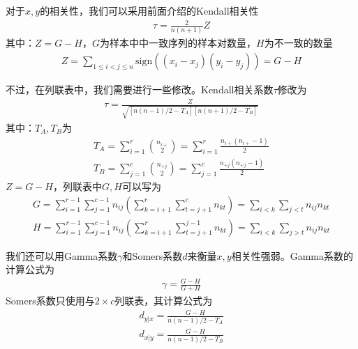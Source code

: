             \par
            对于$x,y$的相关性，我们可以采用前面介绍的Kendall相关性
            \begin{align*}
            \tau = \frac{2}{n(n+1)}Z
            \end{align*}
            其中：$Z = G-H$，$G$为样本中中一致序列的样本对数量，$H$为不一致的数量
            \begin{align*}
            Z = \sum_{1 \leqslant i<j \leqslant n} \mathrm{sign}((x_i-x_j)(y_i-y_j)) = G-H
            \end{align*}
            \par
            不过，在列联表中，我们需要进行一些修改。Kendall相关系数$\tau$修改为
            \begin{align*}
            \tau = \frac{Z}{\sqrt{[n(n-1)/2-T_A][n(n+1)/2-T_B]}}
            \end{align*}
            其中：$T_A,T_B$为
            \begin{align*}
            T_A = \sum_{i=1}^r \binom{n_{i+}}{2} = \sum_{i=1}^r\frac{n_{i+}(n_{i+}-1)}{2}\\
            T_B = \sum_{j=1}^c \binom{n_{+j}}{2} = \sum_{j=1}^c\frac{n_{+j}(n_{+j}-1)}{2}
            \end{align*}
            $Z = G-H$，列联表中$G,H$可以写为
            \begin{align*}
            G = \sum_{i=1}^{r-1}\sum_{j=1}^{c-1} n_{ij} \left( \sum_{k=i+1}^r\sum_{t=j+1}^c n_{kt}\right)  = \sum_{i<k}\sum_{j<t}n_{ij}n_{kt}\\
            H = \sum_{i=1}^{r-1}\sum_{j=1}^{c-1} n_{ij} \left( \sum_{k=i+1}^r\sum_{t=j+1}^{j-1} n_{kt}\right)  = \sum_{i<k}\sum_{j>t}n_{ij}n_{kt}
            \end{align*}
            \par
            我们还可以用Gamma系数$\gamma$和Somers系数$d$来衡量$x,y$相关性强弱。Gamma系数的计算公式为
            \begin{align*}
            \gamma = \frac{G-H}{G+H}
            \end{align*}
            Somers系数只使用与$2\times c$列联表，其计算公式为
            \begin{align*}
            d_{y|x} = \frac{G-H}{n(n-1)/2 - T_A}\\
            d_{x|y} = \frac{G-H}{n(n-1)/2 - T_B}
            \end{align*}
            \par

